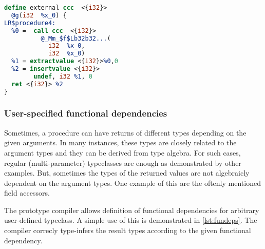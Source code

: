 \begin{listing}
\begin{center}
\begin{minipage}{0.5\linewidth}
\begin{lstlisting}[language=LLVM, basicstyle=\scriptsize\ttfamily]
define external ccc  <{i32}>
  @g(i32  %x_0) {
LR$procedure4:
  %0 =  call ccc  <{i32}>
          @_Mm_$f$Lb32b32...(
            i32  %x_0,
            i32  %x_0)
  %1 = extractvalue <{i32}>%0,0
  %2 = insertvalue <{i32}>
        undef, i32 %1, 0
  ret <{i32}> %2
}
    \end{lstlisting}
    \end{minipage}
    \end{center}
\end{listing}

\subsubsection{User-specified functional dependencies}
\label{sec:uspecFD}

Sometimes, a procedure can have returns of different types depending on the given arguments. In many instances, these types are closely related to the argument types and they can be derived from type algebra. For such cases, regular (multi-parameter) typeclasses are enough as demonstrated by other examples. But, sometimes the types of the returned values are not algebraicly dependent on the argument types. One example of this are the oftenly mentioned field accessors.

The prototype compiler allows definition of functional dependencies for arbitrary user-defined typeclass. A simple use of this is demonstrated in \cref{lst:fundeps}. The compiler correcly type-infers the result types according to the given functional dependency.

